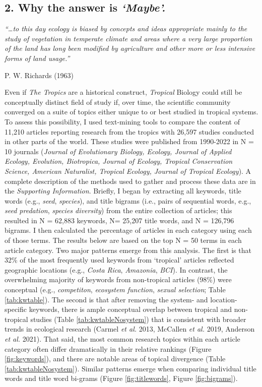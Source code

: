 \documentclass[
  12pt,
  man, donotrepeattitle,floatsintext]{apa6}
\begin{document}
\hypertarget{why-the-answer-is-maybe.}{%
\subsection{\texorpdfstring{2. Why the answer is \emph{`Maybe'.}}{2. Why the answer is `Maybe'.}}\label{why-the-answer-is-maybe.}}

\noindent \emph{``\ldots to this day ecology is biased by concepts and ideas appropriate mainly to the study of vegetation in temperate climate and areas where a very large proportion of the land has long been modified by agriculture and other more or less intensive forms of land usage.''}

\hfill P. W. Richards (1963)
\bigskip

\noindent Even if \emph{The Tropics} are a historical construct, \emph{Tropical} Biology could still be conceptually distinct field of study if, over time, the scientific community converged on a suite of topics either unique to or best studied in tropical systems. To assess this possibility, I used text-mining tools to compare the content of 11,210 articles reporting research from the tropics with 26,597 studies conducted in other parts of the world. These studies were published from 1990-2022 in N = 10 journals (\emph{Journal of Evolutionary Biology, Ecology, Journal of Applied Ecology, Evolution, Biotropica, Journal of Ecology, Tropical Conservation Science, American Naturalist, Tropical Ecology, Journal of Tropical Ecology}).
A complete description of the methods used to gather and process these data are in the \emph{Supporting Information}. Briefly, I began by extracting all keywords, title words (e.g., \emph{seed}, \emph{species}), and title bigrams (i.e., pairs of sequential words, e.g., \emph{seed predation}, \emph{species diversity}) from the entire collection of articles; this resulted in N = 62,883 keywords, N= 25,207 title words, and N = 126,796 bigrams. I then calculated the percentage of articles in each category using each of those terms. The results below are based on the top N = 50 terms in each article category.
Two major patterns emerge from this analysis. The first is that 32\% of the most frequently used keywords from `tropical' articles reflected geographic locations (e.g., \emph{Costa Rica}, \emph{Amazonia}, \emph{BCI}). In contrast, the overwhelming majority of keywords from non-tropical articles (98\%) were conceptual (e.g., \emph{competiton}, \emph{ecosystem function}, \emph{sexual selection}; Table \ref{tab:kwtable}). The second is that after removing the system- and location-specific keywords, there is ample conceptual overlap between tropical and non-tropical studies (Table \ref{tab:kwtableNosystem}) that is consistent with broader trends in ecological research (Carmel \emph{et al.} 2013, McCallen \emph{et al.} 2019, Anderson \emph{et al.} 2021). That said, the most common research topics within each article category often differ dramatically in their relative rankings (Figure \ref{fig:keywords}), and there are notable areas of topical divergence (Table \ref{tab:kwtableNosystem}). Similar patterns emerge when comparing individual title words and title word bi-grams (Figure \ref{fig:titlewords}, Figure \ref{fig:bigrams}).\\
\end{document}
